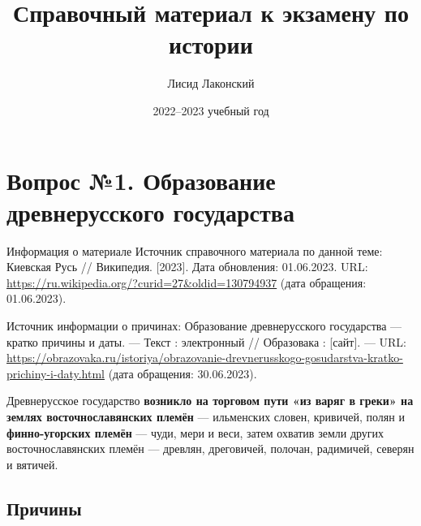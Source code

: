 \documentclass{article}
\title{Справочный материал к экзамену по истории}
\author{Лисид Лаконский}
\date{2022–2023 учебный год}
\begin{document}
\raggedright

\maketitle
\tableofcontents
\pagebreak

\section{Вопрос №1. Образование древнерусского государства}

\begin{bclogo}[logo=\bcinfo, couleurBarre=orange, noborder=true, couleur=white]{Информация о материале}
    Источник справочного материала по данной теме: Киевская Русь // Википедия. [2023]. Дата обновления: 01.06.2023. URL: \url{https://ru.wikipedia.org/?curid=27&oldid=130794937} (дата обращения: 01.06.2023).

    Источник информации о причинах: Образование древнерусского государства — кратко причины и даты. — Текст : электронный // Образовака : [сайт]. — URL: \href{https://obrazovaka.ru/istoriya/obrazovanie-drevnerusskogo-gosudarstva-kratko-prichiny-i-daty.html}{https://obrazovaka.ru/istoriya/obrazovanie-drevnerusskogo-gosudarstva-kratko-prichiny-i-daty.html} (дата обращения: 30.06.2023).
\end{bclogo}

Древнерусское государство \textbf{возникло на торговом пути «из варяг в греки» на землях восточнославянских племён} — ильменских словен, кривичей, полян и \textbf{финно-угорских племён} — чуди, мери и веси, затем охватив земли других восточнославянских племён — древлян, дреговичей, полочан, радимичей, северян и вятичей.

\subsection{Причины}
\end{document}
